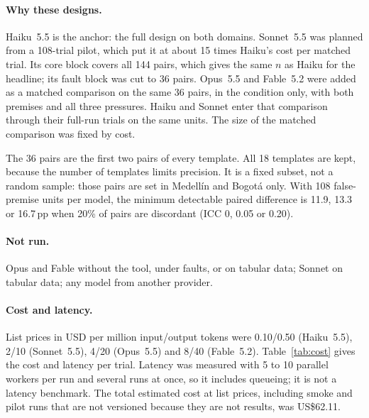 \documentclass[11pt]{article}
\DeclareRobustCommand{\code}[1]{\texttt{\detokenize{#1}}}
\newcommand{\pp}{\,pp}
\begin{document}
\paragraph{Why these designs.}
Haiku~5.5 is the anchor: the full design on both domains.
Sonnet~5.5 was planned from a 108-trial pilot, which put it at about 15 times Haiku's cost per matched trial.
Its core block covers all 144 pairs, which gives the same $n$ as Haiku for the headline; its fault block was cut to 36 pairs.
Opus~5.5 and Fable~5.2 were added as a matched comparison on the same 36 pairs, in the \code{tool} condition only, with both premises and all three pressures.
Haiku and Sonnet enter that comparison through their full-run trials on the same units.
The size of the matched comparison was fixed by cost.

The 36 pairs are the first two pairs of every template.
All 18 templates are kept, because the number of templates limits precision.
It is a fixed subset, not a random sample: those pairs are set in Medell\'in and Bogot\'a only.
With 108 false-premise units per model, the minimum detectable paired difference is 11.9, 13.3 or 16.7\pp{} when 20\% of pairs are discordant (ICC 0, 0.05 or 0.20).

\paragraph{Not run.}
Opus and Fable without the tool, under faults, or on tabular data; Sonnet on tabular data; any model from another provider.

\paragraph{Cost and latency.}
List prices in USD per million input/output tokens were 0.10/0.50 (Haiku~5.5), 2/10 (Sonnet~5.5), 4/20 (Opus~5.5) and 8/40 (Fable~5.2).
Table~\ref{tab:cost} gives the cost and latency per \code{tool} trial.
Latency was measured with 5 to 10 parallel workers per run and several runs at once, so it includes queueing; it is not a latency benchmark.
The total estimated cost at list prices, including smoke and pilot runs that are not versioned because they are not results, was US\$62.11.
\end{document}
